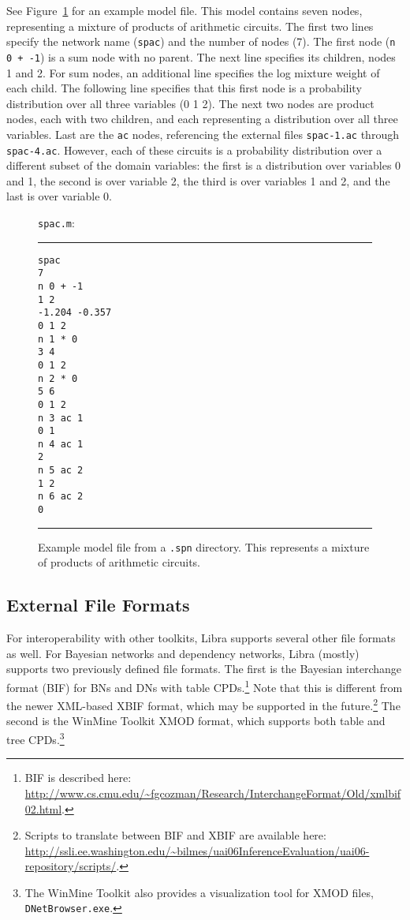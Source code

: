 \documentclass[11pt]{article}
\begin{document}
See Figure~\ref{fig:m} for an example model file.  This model contains
seven nodes, representing a mixture of products of arithmetic
circuits.  The first two lines specify the network name ({\tt spac})
and the number of nodes (7).  The first node ({\tt n 0 + -1}) is a sum
node with no parent.  The next line specifies its children, nodes 1
and 2.  For sum nodes, an additional line specifies the log mixture
weight of each child.  The following line specifies that this first
node is a probability distribution over all three variables (0 1 2).
The next two nodes are product nodes, each with two children, and each
representing a distribution over all three variables.  Last are the
{\tt ac} nodes, referencing the external files {\tt spac-1.ac} through
{\tt spac-4.ac}.  However, each of these circuits is a probability
distribution over a different subset of the domain variables: the
first is a distribution over variables 0 and 1, the second is over
variable 2, the third is over variables 1 and 2, and the last is over
variable 0.

\begin{figure}[tb]
{\tt spac.m}:
\hrule
\begin{small}
\begin{verbatim}
spac
7
n 0 + -1
1 2
-1.204 -0.357
0 1 2
n 1 * 0
3 4
0 1 2
n 2 * 0
5 6
0 1 2
n 3 ac 1
0 1
n 4 ac 1
2
n 5 ac 2
1 2
n 6 ac 2
0
\end{verbatim}
\end{small}
\hrule
\caption{Example model file from a {\tt .spn} directory.
This represents a mixture of products of arithmetic circuits.}
\label{fig:m}
\end{figure}

\subsection{External File Formats}

For interoperability with other toolkits, Libra supports several other
file formats as well. For Bayesian networks and dependency networks,
Libra (mostly) supports two previously defined file formats.  The
first is the Bayesian interchange format (BIF) for BNs and DNs with
table CPDs.\footnote{BIF is described here:
\url{http://www.cs.cmu.edu/~fgcozman/Research/InterchangeFormat/Old/xmlbif02.html}.}
Note that this is different from the newer XML-based XBIF format,
which may be supported in the future.\footnote{Scripts to translate between
BIF and XBIF are available here:
\url{http://ssli.ee.washington.edu/~bilmes/uai06InferenceEvaluation/uai06-repository/scripts/}.}
The second is the WinMine Toolkit XMOD format, which supports both
table and tree CPDs.\footnote{The WinMine Toolkit also provides a
visualization tool for XMOD files, {\tt DNetBrowser.exe}.}
\end{document}
